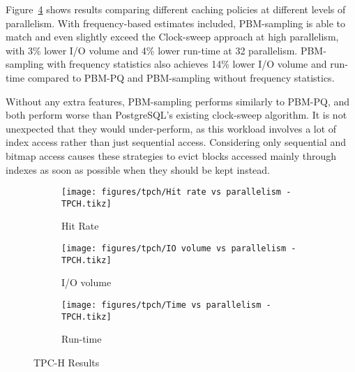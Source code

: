 Figure~\ref{fig:tpch_results} shows results comparing different caching policies at different levels of parallelism. With frequency-based estimates included, PBM-sampling is able to match and even slightly exceed the Clock-sweep approach at high parallelism, with 3\% lower I/O volume and 4\% lower run-time at 32 parallelism. PBM-sampling with frequency statistics also achieves 14\% lower I/O volume and run-time compared to PBM-PQ and PBM-sampling without frequency statistics.

Without any extra features, PBM-sampling performs similarly to PBM-PQ, and both perform worse than PostgreSQL's existing clock-sweep algorithm. It is not unexpected that they would under-perform, as this workload involves a lot of index access rather than just sequential access. Considering only sequential and bitmap access causes these strategies to evict blocks accessed mainly through indexes as soon as possible when they should be kept instead.


\begin{figure}
\centering
    \begin{subfigure}{0.45\textwidth}
        \centering
        \texttt{[image: figures/tpch/Hit rate vs parallelism - TPCH.tikz]}
        \caption{Hit Rate}
        \label{fig:tpch_hitrate}
    \end{subfigure}\hspace{0.05\textwidth}%
    \begin{subfigure}{0.45\textwidth}
        \centering
        \texttt{[image: figures/tpch/IO volume vs parallelism - TPCH.tikz]}
        \caption{I/O volume}
        \label{fig:tpch_iovol}
    \end{subfigure}
    
\vspace{20pt}
    \begin{subfigure}{0.45\textwidth}
        \centering
        \texttt{[image: figures/tpch/Time vs parallelism - TPCH.tikz]}
        \caption{Run-time}
        \label{fig:tpch_time}
    \end{subfigure}
    \caption{TPC-H Results}
    \label{fig:tpch_results}
\end{figure}





